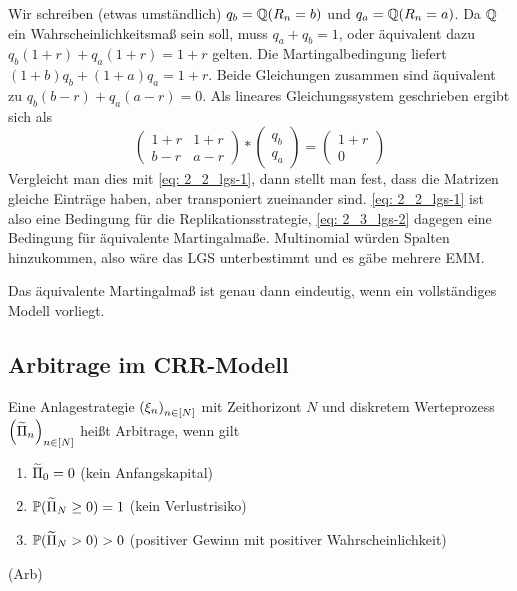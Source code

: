 \begin{*bemerkung_inline}
	Wir schreiben (etwas umständlich) $q_b = \mathbb{Q}(R_n = b)$ und $q_a = \mathbb{Q}(R_n = a)$. Da $\mathbb{Q}$ ein Wahrscheinlichkeitsmaß sein soll, muss $q_a + q_b = 1$, oder äquivalent dazu $q_b (1+r) + q_a (1+r) = 1+r$ gelten. Die Martingalbedingung liefert $(1+b) q_b + (1+a) q_a = 1+r$. Beide Gleichungen zusammen sind äquivalent zu $q_b (b-r) + q_a (a-r) = 0$. Als lineares Gleichungssystem geschrieben ergibt sich als
	\begin{equation*}
		\begin{pmatrix}
			1+r & 1+r \\
			b-r & a-r
		\end{pmatrix}
		* 
		\begin{pmatrix}
			q_b \\ q_a
		\end{pmatrix}
		=
		\begin{pmatrix}
		1+r \\ 0
		\end{pmatrix}
		\tag{LGS-2}
		\label{eq: 2_3_lgs-2}
	\end{equation*}
	Vergleicht man dies mit \eqref{eq: 2_2_lgs-1}, dann stellt man fest, dass die Matrizen gleiche Einträge haben, aber transponiert zueinander sind. 
	\eqref{eq: 2_2_lgs-1} ist also eine Bedingung für die Replikationsstrategie, \eqref{eq: 2_3_lgs-2} dagegen eine Bedingung für äquivalente Martingalmaße.
	Multinomial würden Spalten hinzukommen, also wäre das LGS unterbestimmt und es gäbe mehrere EMM.
\end{*bemerkung_inline}

\begin{*bemerkung_inline}
	Das äquivalente Martingalmaß ist genau dann eindeutig, wenn ein vollständiges Modell vorliegt.
\end{*bemerkung_inline}

\subsection{Arbitrage im CRR-Modell}

\begin{*definition}
	Eine Anlagestrategie $\left( \xi_n \right)_{n \in [N]}$ mit Zeithorizont $N$ und diskretem Werteprozess $\left( \widetilde{\Pi}_n \right)_{n \in [N]}$ heißt Arbitrage, wenn gilt
	\begin{enumerate}
		\item $\widetilde{\Pi}_0 = 0$ (kein Anfangskapital)
		\item $\mathbb{P}(\widetilde{\Pi}_N \ge 0) = 1$ (kein Verlustrisiko)
		\item $\mathbb{P}(\widetilde{\Pi}_N > 0) > 0$ (positiver Gewinn mit positiver Wahrscheinlichkeit)
	\end{enumerate} (Arb)
\end{*definition}

